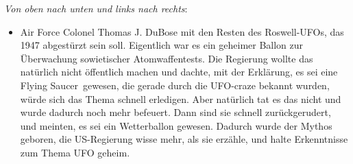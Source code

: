 \documentclass{scrartcl}
\begin{document}
\textit{Von oben nach unten und links nach rechts}:

\begin{itemize}
	\item Air Force Colonel Thomas J. DuBose mit den Resten des Roswell-\frq UFOs\flq, das 1947 abgestürzt sein soll. Eigentlich war es ein geheimer Ballon zur Überwachung sowietischer Atomwaffentests. Die Regierung wollte das natürlich nicht öffentlich machen und dachte, mit der Erklärung, es sei eine \frq Flying Saucer\flq\ gewesen, die gerade durch die UFO-craze bekannt wurden, würde sich das Thema schnell erledigen. Aber natürlich tat es das nicht und wurde dadurch noch mehr befeuert. Dann sind sie schnell zurückgerudert, und meinten, es sei ein Wetterballon gewesen. Dadurch wurde der Mythos geboren, die US-Regierung wisse mehr, als sie erzähle, und halte Erkenntnisse zum Thema UFO geheim.



\end{itemize}
\end{document}
